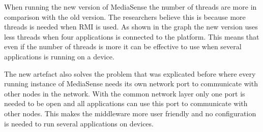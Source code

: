 When running the new version of MediaSense the number of threads are more in comparison with the old version. The researchers believe this is because more threads is needed when RMI is used. As shown in the graph the new version uses less threads when four applications is connected to the platform. This means that even if the number of threads is more it can be effective to use when several applications is running on a device. 

The new artefact also solves the problem that was explicated before where every running instance of MediaSense needs its own network port to communicate with other nodes in the network. With the common network layer only one port is needed to be open and all applications can use this port to communicate with other nodes. This makes the middleware more user friendly and no configuration is needed to run several applications on devices. 
